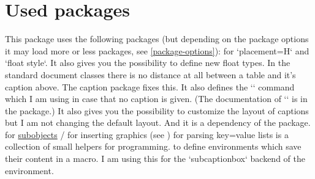 
\section{Used packages}
\label{used-packages}

This package uses the following packages (but depending on the package options it may load more or less packages, see \cref{package-options}):
  for `placement=H` and `float style`.
  It also gives you the possibility to define new float types.
  In the standard document classes there is no distance at all between a table and it's caption above.
  The caption package fixes this.
  It also defines the `` command which I am using in case that no caption is given.
  (The documentation of `` is in the  package.)
  It also gives you the possibility to customize the layout of captions but I am not changing the default layout.
  And it is a dependency of the  package.
  for \hyperref[subobject-environment]{subobjects}
/
  for inserting graphics
  (see )
  for parsing key=value lists
  is a collection of small helpers for programming.
  to define environments which save their content in a macro.
  I am using this for the `subcaptionbox` backend of the  environment.
\endpkgdoc
